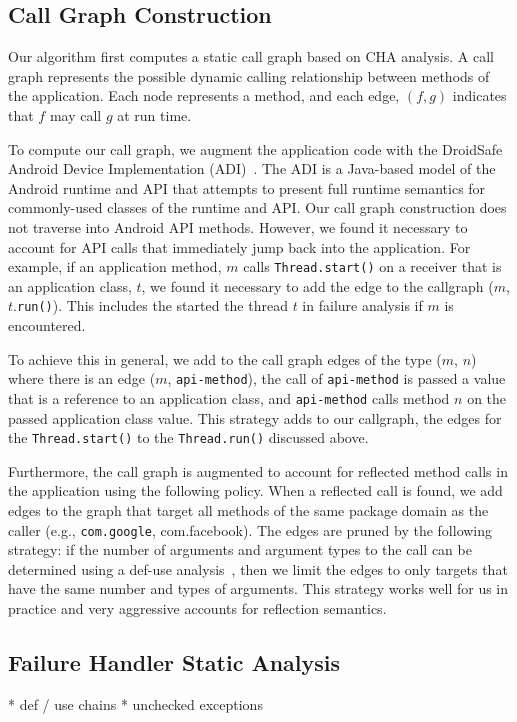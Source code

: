 \subsection{Call Graph Construction}

Our algorithm first computes a static call graph based on CHA
analysis.  A call graph represents the possible dynamic calling
relationship between methods of the application.  Each node represents
a method, and each edge, $(f,g)$ indicates that $f$ may call $g$ at
run time.

To compute our call graph, we augment the application code with the
DroidSafe Android Device Implementation
(ADI)~\cite{Gordon:Kim:Perkins:Gilham:Nguyen:Rinard:NDSS15}.  The ADI
is a Java-based model of the Android runtime and API that attempts to
present full runtime semantics for commonly-used classes of the
runtime and API.  Our call graph construction does not traverse into
Android API methods.  However, we found it necessary to account for
API calls that immediately jump back into the application.  For
example, if an application method, $m$ calls
\lstinline!Thread.start()! on a receiver that is an application class,
$t$, we found it necessary to add the edge to the callgraph ($m$,
$t$.\lstinline!run()!).  This includes the started the thread $t$ in
failure analysis if $m$ is encountered.

To achieve this in general, we add to the call graph edges of the type
($m$, $n$) where there is an edge ($m$, \lstinline!api-method!), the
call of \lstinline!api-method! is passed a value that is a reference
to an application class, and \lstinline!api-method! calls method $n$
on the passed application class value.  This strategy adds to our
callgraph, the edges for the \lstinline!Thread.start()! to the
\lstinline!Thread.run()! discussed above.

Furthermore, the call graph is augmented to account for reflected
method calls in the application using the following policy.  When a
reflected call is found, we add edges to the graph that target all
methods of the same package domain as the caller (e.g.,
\texttt{com.google}, {com.facebook}).  The edges are pruned by the
following strategy: if the number of arguments and argument types to
the call can be determined using a def-use analysis~\cite{Aho2006},
then we limit the edges to only targets that have the same number and
types of arguments.  This strategy works well for us in
practice and very aggressive accounts for reflection semantics.


\subsection{Failure Handler Static Analysis}
* def / use chains
* unchecked exceptions

